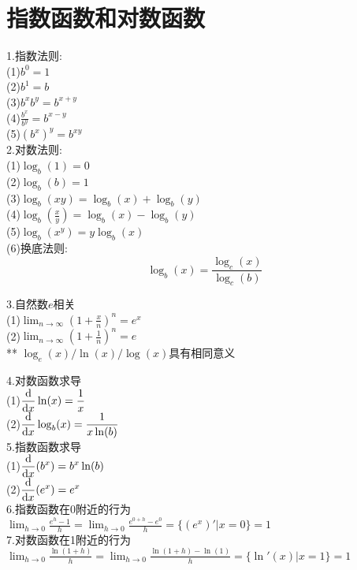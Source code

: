 \chapter{指数函数和对数函数}
1.指数法则:\\
(1)\quad$b^0=1$\\
(2)\quad$b^1=b$\\
(3)\quad$b^xb^y=b^{x+y}$\\[1ex]
(4)\quad$\displaystyle\frac{b^x}{b^y}=b^{x-y}$\\[1ex]
(5)\quad$(b^x)^y=b^{xy}$\\

2.对数法则:\\
(1)\quad$\log_b(1)=0$\\
(2)\quad$\log_b(b)=1$\\
(3)\quad$\log_b(xy)=\log_b(x)+\log_b(y)$\\[1ex]
(4)\quad$\displaystyle\log_b(\frac{x}{y})=\log_b(x)-\log_b(y)$\\[1ex]
(5)\quad$\log_b(x^y)=y\log_b(x)$\\
(6)\quad 换底法则:
\[\log_b(x)=\frac{\log_c(x)}{\log_c(b)}\]

3.自然数$e$相关\\[1ex]
(1)\quad$\displaystyle\lim_{n\to\infty}(1+\frac{x}{n})^n=e^x$\\[1ex]
(2)\quad$\displaystyle\lim_{n\to\infty}(1+\frac{1}{n})^n=e$\\[1ex]
** $\log_e(x)/\ln(x)/\log(x)$具有相同意义

4.对数函数求导\\[1ex]
(1)\quad$\displaystyle\frac{\mathop{}\!\mathrm{d} }{\mathop{}\!\mathrm{d} x}\ln(x)=\frac{1}{x}$\\[1ex]
(2)\quad$\displaystyle\frac{\mathop{}\!\mathrm{d} }{\mathop{}\!\mathrm{d} x}\log_b(x)=\frac{1}{x\ln(b)}$\\[1ex]

5.指数函数求导\\[1ex]
(1)\quad$\displaystyle\frac{\mathop{}\!\mathrm{d} }{\mathop{}\!\mathrm{d} x}(b^x)=b^x\ln(b)$\\[1ex]
(2)\quad$\displaystyle\frac{\mathop{}\!\mathrm{d} }{\mathop{}\!\mathrm{d} x}(e^x)=e^x$\\[1ex]

6.指数函数在0附近的行为\\[1ex]
$\displaystyle\lim_{h\to 0}\frac{e^h-1}{h}=\lim_{h\to 0}\frac{e^{0+h}-e^0}{h}=\{(e^x)'|x=0\}=1$\\[1ex]

7.对数函数在1附近的行为\\[1ex]
$\displaystyle\lim_{h\to 0}\frac{\ln(1+h)}{h}=\lim_{h\to 0}\frac{\ln(1+h)-\ln(1)}{h}=\{\ln'(x)|x=1\}=1$\\[1ex]

